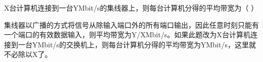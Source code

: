 \question X台计算机连接到一台YMbit/s的集线器上，则每台计算机分得的平均带宽为（ ）
\par{}
\begin{solution}集线器以广播的方式将信号从除输入端口外的所有端口输出，因此任意时刻只能有一个端口的有效数据输入，则平均带宽为Y/XMbit/s。如果此题改为X台计算机连接到一台YMbit/s的交换机上，则每台计算机分得的平均带宽为YMbit/s，这里就不必除以X了。
\end{solution}

